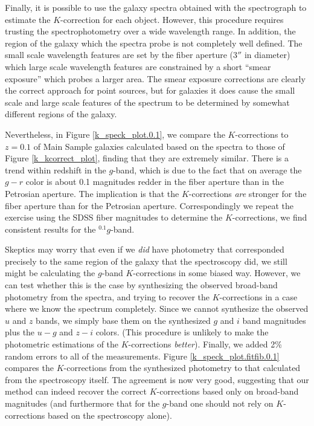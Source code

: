\documentclass[10pt,preprint]{aastex}
\newcommand{\band}[2]{\ensuremath{^{#1}{#2}}}
\begin{document}
Finally, it is possible to use the galaxy spectra obtained with the
spectrograph to estimate the $K$-correction for each object.  However,
this procedure requires trusting the spectrophotometry over a wide
wavelength range. In addition, the region of the galaxy which the
spectra probe is not completely well defined. The small scale
wavelength features are set by the fiber aperture ($3''$ in diameter)
which large scale wavelength features are constrained by a short
``smear exposure'' which probes a larger area. The smear exposure
corrections are clearly the correct approach for point sources, but
for galaxies it does cause the small scale and large scale features of
the spectrum to be determined by somewhat different regions of the
galaxy.

Nevertheless, in Figure \ref{k_speck_plot.0.1}, we compare the
$K$-corrections to $z=0.1$ of Main Sample galaxies calculated based on
the spectra to those of Figure \ref{k_kcorrect_plot}, finding that
they are extremely similar. There is a trend within redshift in the
$g$-band, which is due to the fact that on average the $g-r$ color is
about 0.1 magnitudes redder in the fiber aperture than in the
Petrosian aperture. The implication is that the $K$-corrections {\it
are} stronger for the fiber aperture than for the Petrosian aperture.
Correspondingly we repeat the exercise using the SDSS fiber magnitudes
to determine the $K$-corrections, we find consistent results for the
$\band{0.1}{g}$-band. 

Skeptics may worry that even if we {\it did} have photometry that
corresponded precisely to the same region of the galaxy that the
spectroscopy did, we still might be calculating the $g$-band
$K$-corrections in some biased way. However, we can test whether this
is the case by synthesizing the observed broad-band photometry from
the spectra, and trying to recover the $K$-corrections in a case where
we know the spectrum completely. Since we cannot synthesize the
observed $u$ and $z$ bands, we simply base them on the synthesized $g$
and $i$ band magnitudes plus the $u-g$ and $z-i$ colors. (This
procedure is unlikely to make the photometric estimations of the
$K$-corrections {\it better}). Finally, we added 2\% random errors to
all of the measurements. Figure \ref{k_speck_plot.fitfib.0.1} compares
the $K$-corrections from the synthesized photometry to that calculated
from the spectroscopy itself. The agreement is now very good,
suggesting that our method can indeed recover the correct
$K$-corrections based only on broad-band magnitudes (and furthermore
that for the $g$-band one should not rely on $K$-corrections based on
the spectroscopy alone).
\end{document}
